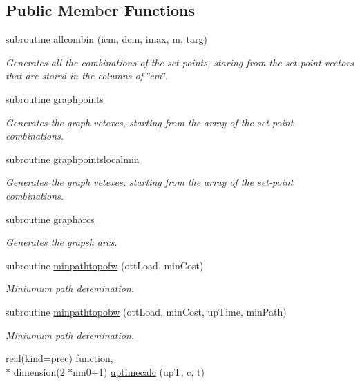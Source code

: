 \subsection*{Public Member Functions}
\begin{DoxyCompactItemize}
\item 
subroutine \hyperlink{classgraphtools_a4607d975b5dd57d2ca7fcdbab2b1ef56}{allcombin} (icm, dcm, imax, m, targ)
\begin{DoxyCompactList}\small\item\em Generates all the combinations of the set points, staring from the set-\/point vectors that are stored in the columns of \char`\"{}cm\char`\"{}. \end{DoxyCompactList}\item 
subroutine \hyperlink{classgraphtools_a94b8e6e5a3d3cc0c3bedbe00d57fc2f9}{graphpoints}
\begin{DoxyCompactList}\small\item\em Generates the graph vetexes, starting from the array of the set-\/point combinations. \end{DoxyCompactList}\item 
subroutine \hyperlink{classgraphtools_a38a6d91f7f573b0f49db0a4d52868773}{graphpointslocalmin}
\begin{DoxyCompactList}\small\item\em Generates the graph vetexes, starting from the array of the set-\/point combinations. \end{DoxyCompactList}\item 
subroutine \hyperlink{classgraphtools_a47c76f30f7f4917536f94c642ffca865}{grapharcs}
\begin{DoxyCompactList}\small\item\em Generates the grapsh arcs. \end{DoxyCompactList}\item 
subroutine \hyperlink{classgraphtools_ade3577b19aec190e8e056f041bc8afdf}{minpathtopofw} (ott\-Load, min\-Cost)
\begin{DoxyCompactList}\small\item\em Miniumum path detemination. \end{DoxyCompactList}\item 
subroutine \hyperlink{classgraphtools_abef4e47145f628bc6d3001d4f6bd9601}{minpathtopobw} (ott\-Load, min\-Cost, up\-Time, min\-Path)
\begin{DoxyCompactList}\small\item\em Miniumum path detemination. \end{DoxyCompactList}\item 
real(kind=prec) function, \\*
dimension(2 $\ast$nm0+1) \hyperlink{classgraphtools_a19fd91ddf4b7d068a7bcb93f47becc9f}{uptimecalc} (up\-T, c, t)
\end{DoxyCompactItemize}
